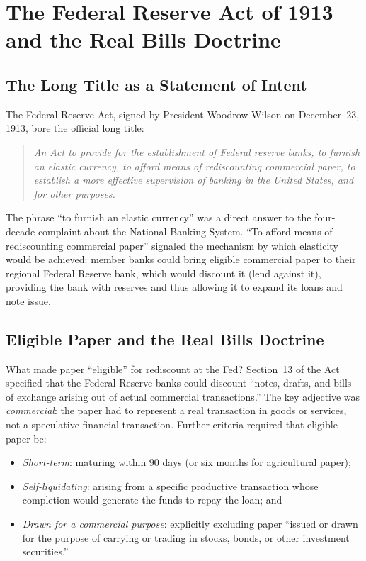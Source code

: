 \documentclass[12pt]{article}
\begin{document}
\section{The Federal Reserve Act of 1913 and the Real Bills Doctrine}
\label{sec:federal-reserve}

\subsection{The Long Title as a Statement of Intent}

The Federal Reserve Act, signed by President Woodrow Wilson on December~23, 1913,
bore the official long title:
\begin{quote}
\emph{An Act to provide for the establishment of Federal reserve banks, to furnish
an elastic currency, to afford means of rediscounting commercial paper, to
establish a more effective supervision of banking in the United States, and for
other purposes.}
\end{quote}

The phrase ``to furnish an elastic currency'' was a direct answer to the
four-decade complaint about the National Banking System.  ``To afford means of
rediscounting commercial paper'' signaled the mechanism by which elasticity would be
achieved: member banks could bring eligible commercial paper to their regional
Federal Reserve bank, which would discount it (lend against it), providing the
bank with reserves and thus allowing it to expand its loans and note issue.

\subsection{Eligible Paper and the Real Bills Doctrine}

What made paper ``eligible'' for rediscount at the Fed?  Section~13 of the
Act specified that the Federal Reserve banks could discount ``notes, drafts, and
bills of exchange arising out of actual commercial transactions.''  The key
adjective was \emph{commercial}: the paper had to represent a real transaction in
goods or services, not a speculative financial transaction.  Further criteria
required that eligible paper be:
\begin{itemize}
  \item \emph{Short-term}: maturing within 90 days (or six months for agricultural
    paper);
  \item \emph{Self-liquidating}: arising from a specific productive transaction
    whose completion would generate the funds to repay the loan; and
  \item \emph{Drawn for a commercial purpose}: explicitly excluding paper ``issued
    or drawn for the purpose of carrying or trading in stocks, bonds, or other
    investment securities.''
\end{itemize}
\end{document}
